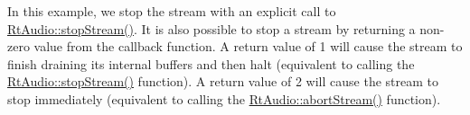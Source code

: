 In this example, we stop the stream with an explicit call to \mbox{\hyperlink{class_rt_audio_af4c241ff86936ecc8108f0d9dfe3efdd}{Rt\+Audio\+::stop\+Stream()}}. It is also possible to stop a stream by returning a non-\/zero value from the callback function. A return value of 1 will cause the stream to finish draining its internal buffers and then halt (equivalent to calling the \mbox{\hyperlink{class_rt_audio_af4c241ff86936ecc8108f0d9dfe3efdd}{Rt\+Audio\+::stop\+Stream()}} function). A return value of 2 will cause the stream to stop immediately (equivalent to calling the \mbox{\hyperlink{class_rt_audio_ad0586b47cd6bb9591a80b4052815991f}{Rt\+Audio\+::abort\+Stream()}} function). 